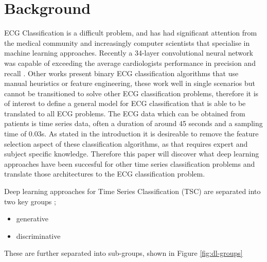 \documentclass[journal]{IEEEtran}
\begin{document}
\section{Background}
ECG Classification is a difficult problem, and has had significant attention from the medical community and increasingly computer scientists that specialise in machine learning approaches. Recently a 34-layer convolutional neural network was capable of exceeding the average cardiologists performance in precision and recall \cite{rajpurkar2017}. Other works present binary ECG classification algorithms that use manual heuristics or feature engineering, these work well in single scenarios but cannot be transitioned to solve other ECG classification problems, therefore it is of interest to define a general model for ECG classification that is able to be translated to all ECG problems. The ECG data which can be obtained from patients is time series data, often a duration of around 45 seconds and a sampling time of 0.03s. As stated in the introduction it is desireable to remove the feature selection aspect of these classification algorithms, as that requires expert and subject specific knowledge. Therefore this paper will discover what deep learning approaches have been succesful for other time series classification problems and translate those architectures to the ECG classification problem.

Deep learning approaches for Time Series Classification (TSC) are separated into two key groups \cite{langkvist2014}; 
\begin{itemize}
    \item generative
    \item discriminative
\end{itemize}
These are further separated into sub-groups, shown in Figure \ref{fig:dl-groups}
\end{document}
